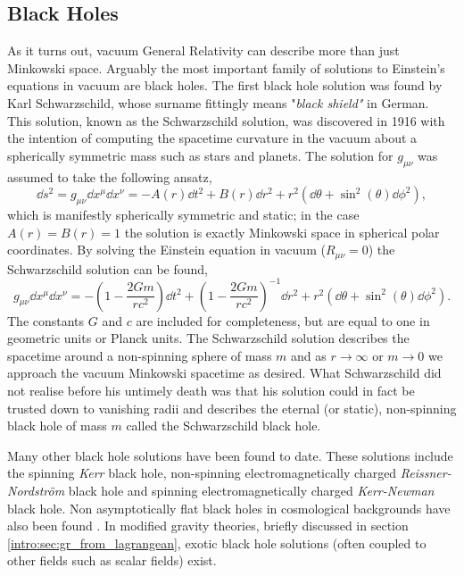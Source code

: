 \subsection{Black Holes}\label{intro:sec:bh_theory}
 As it turns out, vacuum General Relativity can describe more than just Minkowski space. Arguably the most important family of solutions to Einstein's equations in vacuum are black holes. The first black hole solution was found by Karl Schwarzschild, whose surname fittingly means {"\it black shield"} in German. This solution, known as the Schwarzschild solution, was discovered in 1916 with the intention of computing the spacetime curvature in the vacuum about a spherically symmetric mass such as stars and planets. The solution for $g_{\mu\nu}$ was assumed to take the following ansatz,
 \begin{equation} \label{intro:eq:sc_ansatz}
\dd s^2 = g_{\mu\nu} \dd x^\mu \dd x^\nu= -A(r) \dd t^2 + B(r) \dd r^2 + r^2 \left(\dd \theta + \sin^2(\theta) \dd \phi^2\right),
 \end{equation}
which is manifestly spherically symmetric and static; in the case $A(r)=B(r)=1$ the solution is exactly Minkowski space in spherical polar coordinates. By solving the Einstein equation in vacuum ($R_{\mu\nu} = 0$) the Schwarzschild solution can be found,
 \begin{equation}
 g_{\mu\nu} \dd x^\mu \dd x^\nu= -\left(1-\frac{2Gm}{rc^2}\right) \dd t^2 + \left(1-\frac{2Gm}{rc^2}\right)^{-1} \dd r^2 + r^2 \left(\dd \theta + \sin^2(\theta) \dd \phi^2\right).
 \end{equation}
The constants $G$ and $c$ are included for completeness, but are equal to one in geometric units or Planck units. The Schwarzschild solution describes the spacetime around a non-spinning sphere of mass $m$ and as $r\rightarrow \infty$ or $m\rightarrow 0$ we approach the vacuum Minkowski spacetime as desired. What Schwarzschild did not realise before his untimely death was that his solution could in fact be trusted down to vanishing radii and describes the eternal (or static), non-spinning black hole of mass $m$ called the Schwarzschild black hole.

Many other black hole solutions have been found to date. These solutions include the spinning {\it Kerr} black hole, non-spinning electromagnetically charged {\it Reissner-Nordström} black hole and spinning electromagnetically charged {\it Kerr-Newman} black hole. Non asymptotically flat black holes in cosmological backgrounds have also been found \cite{mcvittie1933mass}. In modified gravity theories, briefly discussed in section \ref{intro:sec:gr_from_lagrangean}, exotic black hole solutions (often coupled to other fields such as scalar fields) exist.


